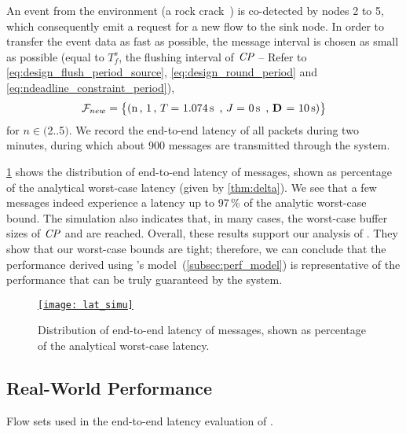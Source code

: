 An event from the environment (\eg a rock crack~\cite{meyer2019IPSN}) is co-detected by nodes 2 to 5, which consequently emit a request for a new flow to the sink node. In order to transfer the event data as fast as possible, the message interval is chosen as small as possible
(\ie equal to $T_f^s$, the flushing interval of $\mathit{CP}$ -- Refer to \eqref{eq:design_flush_period_source}, \eqref{eq:design_round_period} and \eqref{eq:ndeadline_constraint_period}),
\[
\mathcal{F}_{new} =
	\left\lbrace
	\begin{tabular}{@{}l@{}}
	(n\,, 1\,, \periodany = 1.074\s\,, \jitterany = 0\s\,, \deadlineany = 10\s )\\
	\end{tabular}
	\right\rbrace
\]
for $n \in ($2$ .. $5$)$. We record the end-to-end latency of all packets during two minutes, during which about 900 messages are transmitted through the system.

\cref{fig:latency} shows the distribution of end-to-end latency of messages, shown as percentage of the analytical worst-case latency (given by \cref{thm:delta}).
We see that a few messages indeed experience a latency up to 97\,\% of the analytic worst-case bound.
The simulation also indicates that, in many cases, the worst-case buffer sizes of $\mathit{CP}$ and \bolt are reached.
Overall, these results support our analysis of \DRP. They show that our worst-case bounds are tight; therefore, we can conclude that the performance derived using \DRP's model~(\cref{subsec:perf_model}) is representative of the performance that can be truly guaranteed by the system.


\begin{figure}
	\centering
	\href{\drpfig{Figure-11}}{%
	\texttt{[image: lat\_simu]}}
	\caption{Distribution of end-to-end latency of messages, shown as percentage of the analytical worst-case latency.
	 }
	\label{fig:latency}
\end{figure}

\subsection{Real-World Performance}
\label{subsec:flocklab}

\begin{table}
	\caption{Flow sets used in the end-to-end latency evaluation of \DRP.
	}
	{\smaller}
	\label{tab:flow_set}
\end{table}

